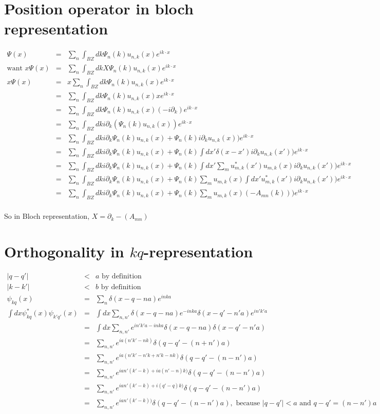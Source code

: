 \documentclass[12pt]{article}
\begin{document}
\section{Position operator in bloch representation}
\begin{eqnarray}\Psi(x) &=& \sum_n\int_{BZ} dk\Psi_n(k)u_{n,k}(x)e^{ik\cdot x}\\
\mbox{want }x\Psi(x) &=& \sum_n\int_{BZ} dk X\Psi_n(k)u_{n,k}(x)e^{ik\cdot x}\\
x\Psi(x) &=& x\sum_n\int_{BZ} dk\Psi_n(k)u_{n,k}(x)e^{ik\cdot x}\\
&=& \sum_n\int_{BZ} dk\Psi_n(k)u_{n,k}(x)xe^{ik\cdot x}\\
&=& \sum_n\int_{BZ} dk\Psi_n(k)u_{n,k}(x)(-i\partial_k)e^{ik\cdot x}\\
&=& \sum_n\int_{BZ} dki\partial_k(\Psi_n(k)u_{n,k}(x))e^{ik\cdot x}\\
&=& \sum_n\int_{BZ} dki\partial_k\Psi_n(k)u_{n,k}(x)+\Psi_n(k)i\partial_ku_{n,k}(x))e^{ik\cdot x}\\
&=& \sum_n\int_{BZ} dki\partial_k\Psi_n(k)u_{n,k}(x)+\Psi_n(k)\int dx'\delta(x-x')i\partial_ku_{n,k}(x'))e^{ik\cdot x}\\
&=& \sum_n\int_{BZ} dki\partial_k\Psi_n(k)u_{n,k}(x)+\Psi_n(k)\int dx'\sum_mu^\ast_{m,k}(x') u_{m,k}(x)i\partial_ku_{n,k}(x'))e^{ik\cdot x}\\
&=& \sum_n\int_{BZ} dki\partial_k\Psi_n(k)u_{n,k}(x)+\Psi_n(k)\sum_m u_{m,k}(x)\int dx'u^\ast_{m,k}(x')i\partial_ku_{n,k}(x'))e^{ik\cdot x}\\
&=& \sum_n\int_{BZ} dki\partial_k\Psi_n(k)u_{n,k}(x)+\Psi_n(k)\sum_m u_{m,k}(x)(-A_{mn}(k)))e^{ik\cdot x}\\
\end{eqnarray}

So in Bloch representation, $X = \partial_k-(A_{mn})$

\section{Orthogonality in $kq$-representation}
\begin{eqnarray}|q-q'| &<& a \mbox{ by definition} \\
|k-k'| &<& b \mbox{ by definition} \\
\psi_{kq}(x) &=& \sum_n\delta(x-q-na)e^{inka}\\
\int dx\psi_{kq}^\ast(x)\psi_{k'q'}(x) &=& \int dx\sum_{n,n'}\delta(x-q-na)e^{-inka}\delta(x-q'-n'a)e^{in'k'a}\\
&=& \int dx\sum_{n,n'}e^{in'k'a-inka}\delta(x-q-na)\delta(x-q'-n'a)\\
&=& \sum_{n,n'}e^{ia(n'k'-nk)}\delta(q-q'-(n+n')a)\\
&=& \sum_{n,n'}e^{ia(n'k'-n'k+n'k-nk)}\delta(q-q'-(n-n')a)\\
&=& \sum_{n,n'}e^{ian'(k'-k)+ia(n'-n)k)}\delta(q-q'-(n-n')a)\\
&=& \sum_{n,n'}e^{ian'(k'-k)+i(q'-q)k)}\delta(q-q'-(n-n')a)\\
&=& \sum_{n,n'}e^{ian'(k'-k))}\delta(q-q'-(n-n')a), \mbox{ because }|q-q'|<a \mbox{ and } q-q'=(n-n')a\\
\end{eqnarray}
\end{document}
